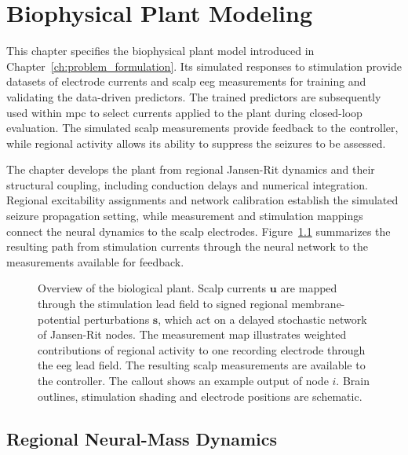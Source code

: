 \chapter{Biophysical Plant Modeling}\label{ch:biological_plant_modeling}

This chapter specifies the biophysical plant model introduced in Chapter~\ref{ch:problem_formulation}.
Its simulated responses to stimulation provide datasets of electrode currents and scalp \ac{eeg} measurements for training and validating the data-driven predictors.
The trained predictors are subsequently used within \ac{mpc} to select currents applied to the plant during closed-loop evaluation.
The simulated scalp measurements provide feedback to the controller, while regional activity allows its ability to suppress the seizures to be assessed.

The chapter develops the plant from regional Jansen-Rit dynamics and their structural coupling, including conduction delays and numerical integration.
Regional excitability assignments and network calibration establish the simulated seizure propagation setting, while measurement and stimulation mappings connect the neural dynamics to the scalp electrodes.
Figure~\ref{fig:plant_overview} summarizes the resulting path from stimulation currents through the neural network to the measurements available for feedback.


\begin{figure}[h] %
    \centering
    
    \caption{Overview of the biological plant. Scalp currents $\mathbf{u}$ are mapped through the stimulation lead field to signed regional membrane-potential perturbations $\mathbf{s}$, which act on a delayed stochastic network of Jansen-Rit nodes. The measurement map illustrates weighted contributions of regional activity to one recording electrode through the \ac{eeg} lead field. The resulting scalp measurements are available to the controller. The callout shows an example output of node $i$. Brain outlines, stimulation shading and electrode positions are schematic.}
    \label{fig:plant_overview}
\end{figure}
\pagebreak

\section{Regional Neural-Mass Dynamics}
\label{sec:regional_neural_mass}

